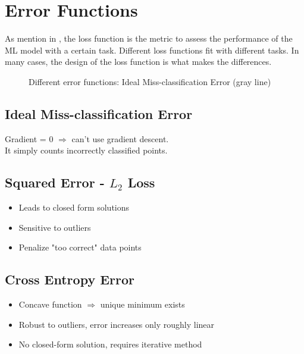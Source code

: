 \chapter{Error Functions}
As mention in , the loss function is the metric to assess the performance of the \ac{ML} model with a certain task. Different loss functions fit with different tasks. In many cases, the design of the loss function is what makes the differences.


\begin{figure}[!h]
	\centering
	\caption{Different error functions: Ideal Miss-classification Error (gray line)}
\end{figure}

\section{Ideal Miss-classification Error}
Gradient = 0 $\Rightarrow$ can't use gradient descent.\\
It simply counts incorrectly classified points.

\section{Squared Error - $L_2$ Loss}
\begin{itemize}
	\item Leads to closed form solutions
	\item Sensitive to outliers
	\item Penalize "too correct" data points
\end{itemize}

\section{Cross Entropy Error}
\begin{itemize}
	\item Concave function $\Rightarrow$ unique minimum exists
	\item Robust to outliers, error increases only roughly linear
	\item No closed-form solution, requires iterative method
\end{itemize}


